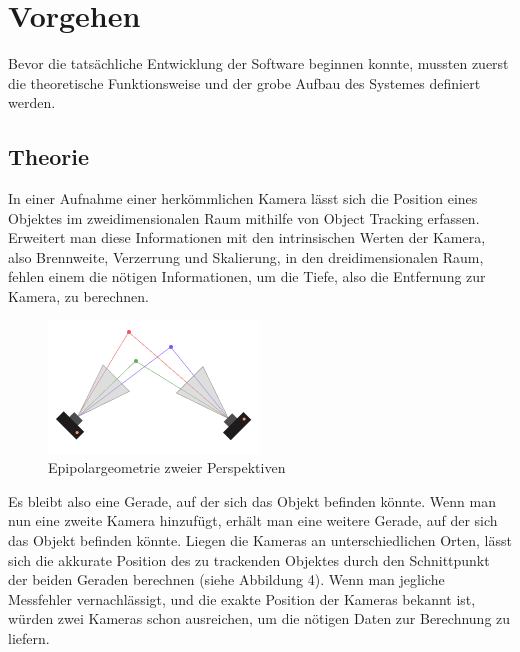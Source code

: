 \documentclass[12pt, ngerman]{article}
\begin{document}
\section{Vorgehen}
Bevor die tatsächliche Entwicklung der Software beginnen konnte, mussten zuerst die theoretische Funktionsweise und der grobe Aufbau des Systemes definiert werden.

\subsection{Theorie}
In einer Aufnahme einer herkömmlichen Kamera lässt sich die Position eines Objektes im zweidimensionalen Raum mithilfe von Object Tracking erfassen. Erweitert man diese Informationen mit den intrinsischen Werten der Kamera, also Brennweite, Verzerrung und Skalierung, in den dreidimensionalen Raum, fehlen einem die nötigen Informationen, um die Tiefe, also die Entfernung zur Kamera, zu berechnen.  

\begin{figure}
\centering
  \includegraphics[angle=0,width=\linewidth]{triangulation.png}
  \caption{Epipolargeometrie zweier Perspektiven}
\end{figure}
Es bleibt also eine Gerade, auf der sich das Objekt befinden könnte. Wenn man nun eine zweite Kamera hinzufügt, erhält man eine weitere Gerade, auf der sich das Objekt befinden könnte. Liegen die Kameras an unterschiedlichen Orten, lässt sich die akkurate Position des zu trackenden Objektes durch den Schnittpunkt der beiden Geraden berechnen (siehe Abbildung 4). Wenn man jegliche Messfehler vernachlässigt, und die exakte Position der Kameras bekannt ist, würden zwei Kameras schon ausreichen, um die nötigen Daten zur Berechnung zu liefern.  
\end{document}
